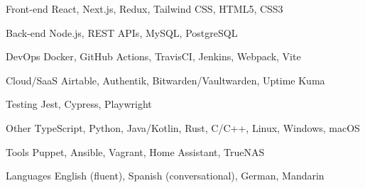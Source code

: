 

\begin{cvskills}

  \cvskill
    {Front-end} %
    {React, Next.js, Redux, Tailwind CSS, HTML5, CSS3} %
    
  \cvskill
    {Back-end} %
    {Node.js, REST APIs, MySQL, PostgreSQL} %

  \cvskill
    {DevOps} %
    {Docker, GitHub Actions, TravisCI, Jenkins, Webpack, Vite} %

  \cvskill
    {Cloud/SaaS} %
    {Airtable, Authentik, Bitwarden/Vaultwarden, Uptime Kuma} %

  \cvskill
    {Testing} %
    {Jest, Cypress, Playwright} %

  \cvskill
    {Other} %
    {TypeScript, Python, Java/Kotlin, Rust, C/C++, Linux, Windows, macOS} %

  \cvskill
    {Tools} %
    {Puppet, Ansible, Vagrant, Home Assistant, TrueNAS} %

  \cvskill
    {Languages} %
    {English (fluent), Spanish (conversational), German, Mandarin} %

\end{cvskills}
